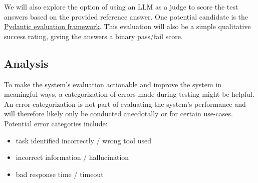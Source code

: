 \documentclass{article}
\begin{document}
We will also explore the option of using an LLM as a judge to score the test answers based on the provided reference answer. One potential candidate is the \href{https://ai.pydantic.dev/evals/#evaluation-with-llmjudge}{Pydantic evaluation framework}. This evaluation will also be a simple qualitative success rating, giving the answers a binary pass/fail score.\\

\subsection{Analysis}
To make the system's evaluation actionable and improve the system in meaningful ways, a categorization of errors made during testing might be helpful. An error categorization is not part of evaluating the system's performance and will therefore likely only be conducted anecdotally or for certain use-cases. Potential error categories include:
\begin{itemize}
    \item task identified incorrectly / wrong tool used
    \item incorrect information / hallucination
    \item bad response time / timeout
\end{itemize}
\end{document}
